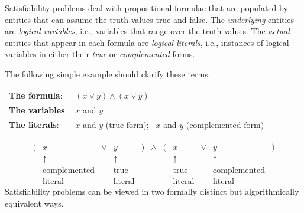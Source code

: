 Satisfiability problems deal with propositional formulae that are
populated by entities that can assume the truth values {\small\sf
  true} and {\small\sf false}. 
The {\em underlying} entities are {\it logical variables},
i.e., variables that range over the truth values.  The {\em actual}
entities that appear in each formula are {\it logical literals}, 
i.e., instances of logical variables in either their {\em true} or
{\em complemented} forms.


The following simple example should clarify these terms.

\begin{tabular}{ll}
{\bf The formula}:  & $(\bar{x} \vee y) \wedge (x \vee \bar{y})$ \\
{\bf The variables}: & $x$ and $y$ \\
{\bf The literals}:  & $x$ and $y$ (true form); \ $\bar{x}$ and $\bar{y}$
(complemented form)
\end{tabular}
\[
\begin{array}{ccccccccccc}
( & \bar{x} & \vee & y & ) & \wedge & ( & x & \vee & \bar{y} & ) \\
  & \uparrow &     & \uparrow & & & & \uparrow & & \uparrow & \\
  & \mbox{complemented} &  & \mbox{true}  & & & & \mbox{true} &
        & \mbox{complemented} &  \\
  & \mbox{literal} & & \mbox{literal} & & & & \mbox{literal} & &
  \mbox{literal} & 
\end{array}
\]
Satisfiability problems can be viewed in two formally distinct but
algorithmically equivalent ways.

